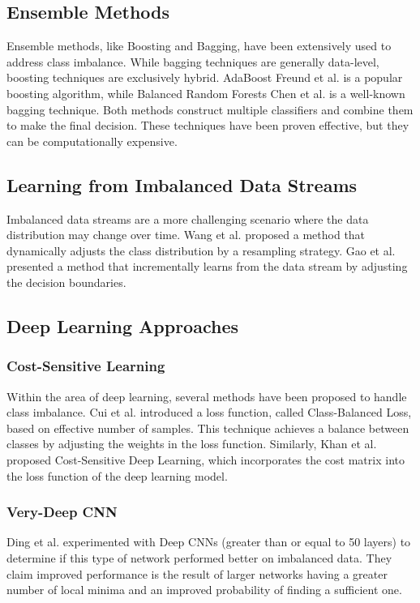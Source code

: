 \documentclass[journal]{IEEEtran}
\begin{document}
	\subsection{Ensemble Methods} 
	
	Ensemble methods, like Boosting and Bagging, have been extensively used to address class imbalance. While bagging techniques are generally data-level, boosting techniques are exclusively hybrid.
	AdaBoost Freund et al. \cite{freund1997} is a popular boosting algorithm, while Balanced Random Forests Chen et al. \cite{chen2004} is a well-known bagging technique. Both methods construct multiple classifiers and combine them to make the final decision. These techniques have been proven effective, but they can be computationally expensive.
	
	\subsection{Learning from Imbalanced Data Streams} 
	
	Imbalanced data streams are a more challenging scenario where the data distribution may change over time. Wang et al. \cite{wang2018} proposed a method that dynamically adjusts the class distribution by a resampling strategy. Gao et al. \cite{gao2015} presented a method that incrementally learns from the data stream by adjusting the decision boundaries.
	
	\subsection{Deep Learning Approaches}
	
	\subsubsection{Cost-Sensitive Learning}
	Within the area of deep learning, several methods have been proposed to handle class imbalance. Cui et al. \cite{cui2019} introduced a loss function, called Class-Balanced Loss, based on effective number of samples. This technique achieves a balance between classes by adjusting the weights in the loss function. Similarly, Khan et al. \cite{khan2017} proposed Cost-Sensitive Deep Learning, which incorporates the cost matrix into the loss function of the deep learning model.	
	
	\subsubsection{Very-Deep CNN}
	Ding et al. experimented with Deep CNNs (greater than or equal to 50 layers) to determine if this type of network performed better on imbalanced data. 
	They claim improved performance is the result of larger networks having a greater number of local minima and an improved probability of finding a sufficient one.
	
\end{document}
